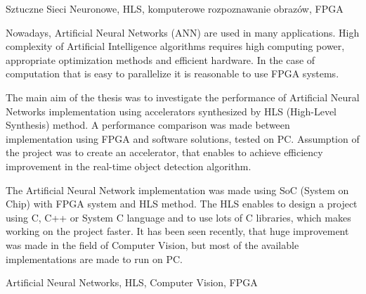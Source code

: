 \documentclass[
    left=2.5cm,         %
    right=2.5cm,        %
    top=2.5cm,          %
    bottom=3cm,         %
    bindingoffset=6mm,  %
    nohyphenation=false %
]{eiti/eiti-thesis}
\begin{document}
\slowakluczowe Sztuczne Sieci Neuronowe, HLS, komputerowe rozpoznawanie 
obrazów, FPGA

\cleardoublepage  %

\abstract
Nowadays, Artificial Neural Networks (ANN) are used in many applications. 
High complexity of Artificial Intelligence algorithms requires high 
computing power, appropriate optimization methods and efficient hardware. 
In the case of computation that is easy to parallelize it is reasonable 
to use FPGA systems. 

The main aim of the thesis was to investigate the performance of 
Artificial Neural Networks implementation using accelerators synthesized 
by HLS (High-Level Synthesis) method. A performance comparison was made
between implementation using FPGA and software solutions, tested on PC.
Assumption of the project was to create an accelerator, that enables
to achieve efficiency improvement in the real-time object detection algorithm. 

The Artificial Neural Network implementation was made using SoC (System on 
Chip) with FPGA system and HLS method. The HLS enables to design a 
project using C, C++ or System C language and to use lots of C libraries, 
which makes working on the project faster. It has been seen recently, that 
huge improvement was made in the field of Computer Vision, but most of the 
available implementations are made to run on PC. 


\keywords Artificial Neural Networks, HLS, Computer Vision, FPGA

\cleardoublepage  %
\pagestyle{plain}
\makeauthorship
\cleardoublepage %
\tableofcontents

\cleardoublepage %
\pagestyle{headings}



\end{document}
